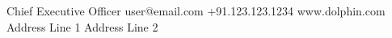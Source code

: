 \documentclass{amm-pst-business-card}
\begin{document}
%
\thispagestyle{empty}%
%
%
{Chief Executive Officer}%
{user@email.com}%
{+91.123.123.1234}%
{www.dolphin.com}%
{Address Line 1}%
{Address Line 2}%
\end{document}
